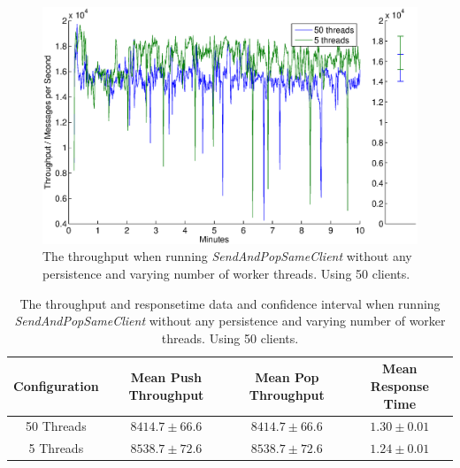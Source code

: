 \documentclass{article}
\begin{document}
            \begin{figure}[H]
                \hspace{-1.5cm}
                \includegraphics[scale=0.40]{throughput_i-fooled-you_50-5-threads-50-clients-1kB-msg}
                \caption{The throughput when running \textit{SendAndPopSameClient} without any persistence and varying number of worker threads. Using 50 clients.}
                \label{fig:throughput_i-fooled-you_50-5-threads-50-clients-1kB-msg.eps}
                \end{figure}
            
            \begin{table}
            \begin{tabular}{|c|c|c|c|}
            \hline 
            Configuration & Mean Push Throughput & Mean Pop Throughput & Mean Response Time \\ 
            \hline 
            50 Threads & $8414.7 \pm 66.6$ & $8414.7 \pm 66.6$ & $1.30 \pm 0.01$ \\ 
            \hline 
            5 Threads & $8538.7 \pm 72.6$ & $8538.7 \pm 72.6$ & $1.24 \pm 0.01$ \\ 
            \hline 
            \end{tabular} 
                \caption{The throughput and responsetime data and confidence interval when running \textit{SendAndPopSameClient} without any persistence and varying number of worker threads. Using 50 clients.}
                \label{tbl:throughput_i-fooled-you_50-5-threads-50-clients-1kB-msg.eps}
            \end{table}
            
\end{document}
